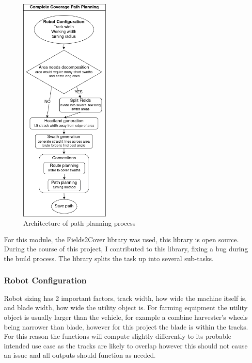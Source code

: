 \documentclass[final]{cmpreport_02}
\begin{document}
\begin{figure}[H]
	\centering
	\includegraphics[width=0.4\textwidth]{./images/pathPlanning.drawio.png}
	\caption{Architecture of path planning process}
	\label{PP:arch}
\end{figure}


For this module, the Fields2Cover library \citep{fields2cover} was used, this library is open source.
During the course of this project, I contributed to this library, fixing a bug during the build process.
The library splits the task up into several sub-tasks.


\subsubsection{Robot Configuration}
Robot sizing has 2 important factors, track width, how wide the machine itself is, and blade width, how wide the utility object is.
For farming equipment the utility object is usually larger than the vehicle, for example a combine harvester's wheels being narrower than blade, however for this project the blade is within the tracks.
For this reason the functions will compute slightly differently to its probable intended use case as the tracks are likely to overlap however this should not cause an issue and all outputs should function as needed.
\end{document}
